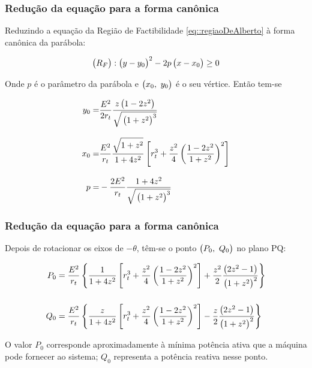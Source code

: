 \documentclass[10pt, compress,xcolor={svgnames,dvipsnames,x11names}]{beamer}
\begin{document}
\begin{frame}%
\frametitle{ Redução da equação para a forma canônica}
\scriptsize

	Reduzindo a equação da Região de Factibilidade \ref{eq::regiaoDeAlberto} à forma canônica da parábola:

\begin{equation}
	\left(\strut R_F\right): \left(\strut y - y_0 \right)^2 - 2p\left(\strut x - x_0 \right) \geq 0
\end{equation}

	Onde $p$ é o parâmetro da parábola e $\left(\strut x_0,\ y_0 \right)$ é o seu vértice. Então tem-se

\begin{align}
	y_0 =& \dfrac{E^2}{2r_t}\dfrac{z\left(\strut 1 - 2z^2\right)}{\sqrt{\strut \left(\strut 1 + z^2\right)^3}} \\[3mm]
	x_0 =& \dfrac{E^2}{r_t}\dfrac{\sqrt{\strut 1 + z^2}}{\strut 1 + 4z^2} \left[\strut r_t^3 + \dfrac{z^2}{4}\left(\dfrac{1 - 2z^2}{1 + z^2}\right)^2 \right] \\[3mm]
	p =& -\dfrac{2E^2}{r_t}\dfrac{1 + 4z^2}{\sqrt{\strut \left(\strut 1 + z^2\right)^3}}
\end{align}

\normalsize
\end{frame}%

\begin{frame}%
\frametitle{ Redução da equação para a forma canônica}
\scriptsize

	Depois de rotacionar os eixos de $-\theta$, têm-se o ponto $\left(\strut P_0,\ Q_0\right)$ no plano PQ:

\begin{align}
		P_0  &= \dfrac{E^2}{r_t}\left\{\strut  \dfrac{1}{\strut 1 + 4z^2} \left[\strut r_t^3 + \dfrac{z^2}{4}\left(\dfrac{1 - 2z^2}{1 + z^2}\right)^2 \right] + \dfrac{z^2}{2}\dfrac{\left(\strut 2z^2 - 1\right)}{\left(\strut 1 + z^2\right)^2} \right\} \\[5mm]
		Q_0 &=  \dfrac{E^2}{r_t}\left\{\strut  \dfrac{z}{\strut 1 + 4z^2} \left[\strut r_t^3 + \dfrac{z^2}{4}\left(\dfrac{1 - 2z^2}{1 + z^2}\right)^2 \right] - \dfrac{z}{2}\dfrac{\left(\strut 2z^2 - 1\right)}{\left(\strut 1 + z^2\right)^2} \right\}
\end{align}

	O valor $P_0$ corresponde aproximadamente à mínima potência ativa que a máquina pode fornecer ao sistema; $Q_0$ representa a potência reativa nesse ponto.
\normalsize
\end{frame}%
\end{document}
